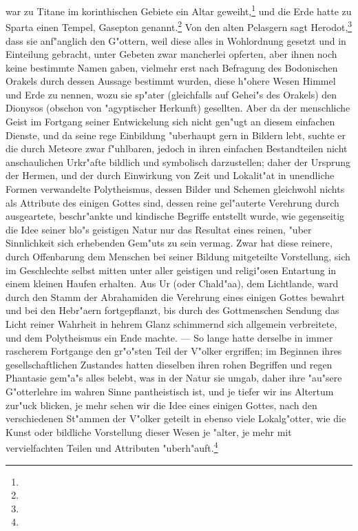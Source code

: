 \documentclass[a4paper, 11pt, oneside, polutonikogreek, german]{article}
\begin{document}
war zu Titane im korinthischen Gebiete ein Altar geweiht,\footnote{} und die Erde hatte zu Sparta einen Tempel, Gasepton genannt.\footnote{} Von den alten Pelasgern sagt Herodot,\footnote{} dass sie anf"anglich den G"ottern, weil diese alles in Wohlordnung gesetzt und in Einteilung gebracht, unter Gebeten zwar mancherlei opferten, aber ihnen noch keine bestimmte Namen gaben, vielmehr erst nach Befragung des Bodonischen Orakels durch dessen Aussage bestimmt wurden, diese h"ohere Wesen Himmel und Erde zu nennen, wozu sie sp"ater (gleichfalls auf Gehei"s des Orakels) den Dionysos (obschon von "agyptischer Herkunft) gesellten. Aber da der menschliche Geist im Fortgang seiner Entwickelung sich nicht gen"ugt an diesem einfachen Dienste, und da seine rege Einbildung "uberhaupt gern in Bildern lebt, suchte er die durch Meteore zwar f"uhlbaren, jedoch in ihren einfachen Bestandteilen nicht anschaulichen Urkr"afte bildlich und symbolisch darzustellen; daher der Ursprung der Hermen, und der durch Einwirkung von Zeit und Lokalit"at in unendliche Formen verwandelte Polytheismus, dessen Bilder und Schemen gleichwohl nichts als Attribute des einigen Gottes sind, dessen reine gel"auterte Verehrung durch ausgeartete, beschr"ankte und kindische Begriffe entstellt wurde, wie gegenseitig die Idee seiner blo"s geistigen Natur nur das Resultat eines reinen, "uber Sinnlichkeit sich erhebenden Gem"uts zu sein vermag. Zwar hat diese reinere, durch Offenbarung dem Menschen bei seiner Bildung mitgeteilte Vorstellung, sich im Geschlechte selbst mitten unter aller geistigen und religi"osen Entartung in einem kleinen Haufen erhalten. Aus Ur (oder Chald"aa), dem Lichtlande, ward durch den Stamm der Abrahamiden die Verehrung eines einigen Gottes bewahrt und bei den Hebr"aern fortgepflanzt, bis durch des Gottmenschen Sendung das Licht reiner Wahrheit in hehrem Glanz schimmernd sich allgemein verbreitete, und dem Polytheismus ein Ende machte. --- So lange hatte derselbe in immer rascherem Fortgange den gr"o"sten Teil der V"olker ergriffen; im Beginnen ihres gesellschaftlichen Zustandes hatten dieselben ihren rohen Begriffen und regen Phantasie gem"a"s alles belebt, was in der Natur sie umgab, daher ihre "au"sere G"otterlehre im wahren Sinne pantheistisch ist, und je tiefer wir ins Altertum zur"uck blicken, je mehr sehen wir die Idee eines einigen Gottes, nach den verschiedenen St"ammen der V"olker geteilt in ebenso viele Lokalg"otter, wie die Kunst oder bildliche Vorstellung dieser Wesen je "alter, je mehr mit vervielfachten Teilen und Attributen "uberh"auft.\footnote{}
\end{document}
